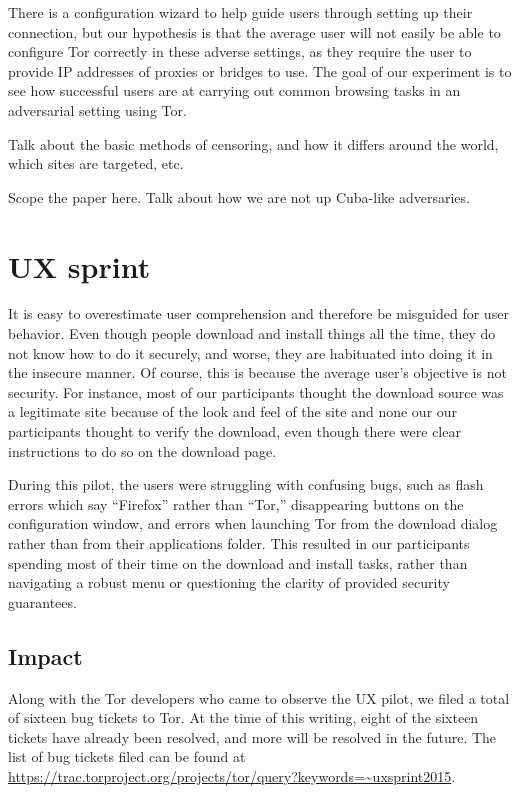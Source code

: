 \documentclass[letterpaper,twocolumn,11pt]{article}
\begin{document}
There is a configuration wizard to help guide users through setting up their connection, but our hypothesis is that the average user will not easily be able to configure Tor correctly in these adverse settings, as they require the user to provide IP addresses of proxies or bridges to use. The goal of our experiment is to see how successful users are at carrying out common browsing tasks in an adversarial setting using Tor.

{\color {red} Talk about the basic methods of censoring, and how it differs 
around the world, which sites are targeted, etc. 

Scope the paper here. Talk about how we are not up Cuba-like adversaries. }

\section{UX sprint}  %
\indent {}

It is easy to overestimate user comprehension and therefore be 
misguided for user behavior. Even though people download and install things all the time, 
they do not know how to do it securely, and worse, they are habituated into doing it in the 
insecure manner. Of course, this is because the average user's objective is not security. 
For instance, most of our participants thought the download source was a legitimate site because
of the look and feel of the site and none our our participants thought to verify the download, 
even though there were clear instructions to do so on the download page. 

During this pilot, the users were struggling with confusing bugs, such as flash errors which
say ``Firefox'' rather than ``Tor,'' disappearing buttons on the configuration window, and errors when
launching Tor from the download dialog rather than from their applications folder. This resulted in our 
participants spending most of their time on the download and install tasks, rather than 
navigating a robust menu or questioning the clarity of provided security guarantees. 

\subsection{Impact}
\indent \indent Along with the Tor developers who came to observe the UX pilot, we filed 
a total of sixteen bug tickets to Tor. At the time of  this writing, eight of the sixteen tickets 
have already been resolved, and more will be resolved in the future.  The list of bug
tickets filed can be found at \url{https://trac.torproject.org/projects/tor/query?keywords=~uxsprint2015}. 
\end{document}
